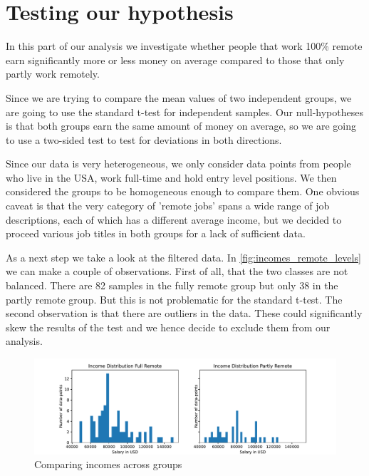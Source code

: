 \documentclass{article}
\begin{document}
\section{Testing our hypothesis}

In this part of our analysis we investigate whether people that work 100\% remote earn significantly more or less money on average compared to those that only partly work remotely.

Since we are trying to compare the mean values of two independent groups, we are going to use the standard t-test for independent samples. Our null-hypotheses is that both groups earn the same amount of money on average, so we are going to use a two-sided test to test for deviations in both directions.

Since our data is very heterogeneous, we only consider data points from people who live in the USA, work full-time and hold entry level positions. We then considered the groups to be homogeneous enough to compare them. One obvious caveat is that the very category of 'remote jobs' spans a wide range of job descriptions, each of which has a different average income, but we decided to proceed various job titles in both groups for a lack of sufficient data.

As a next step we take a look at the filtered data. In \autoref{fig:incomes_remote_levels} we can make a couple of observations. First of all, that the two classes are not balanced. There are 82 samples in the fully remote group but only 38 in the partly remote group. But this is not problematic for the standard t-test. The second observation is that there are outliers in the data. These could significantly skew the results of the test and we hence decide to exclude them from our analysis.

\begin{figure}[!htb]
\centering
\caption{Comparing incomes across groups}
\label{fig:incomes_remote_levels}
\hspace*{-1.2cm}   
\includegraphics[scale=0.55]{fig/incomes_remote_levels.pdf}
\end{figure}
\end{document}
